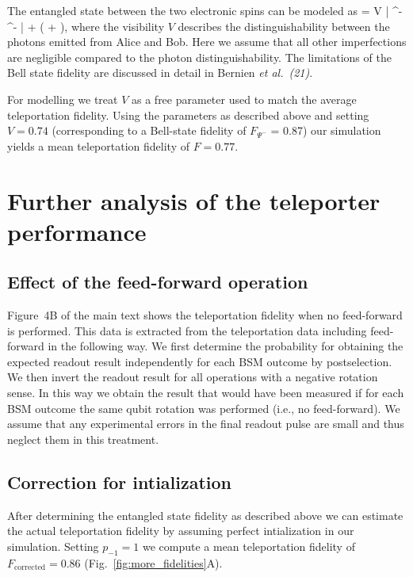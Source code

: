 The entangled state between the two electronic spins can be modeled as
\be
    \rho = V | \Psi^- \rangle \langle \Psi^- | +  \left(  +  \right ),
\ee
where the visibility $V$ describes the distinguishability between the photons emitted from Alice and Bob. Here we assume that all other imperfections are negligible compared to the photon distinguishability. The limitations of the Bell state fidelity are discussed in detail in Bernien {\em et al.}~{\em (21)}. %

For modelling we treat $V$ as a free parameter used to match the average teleportation fidelity. Using the parameters as described above and setting $V = 0.74$ (corresponding to a Bell-state fidelity of $F_{\Psi^-}$ = 0.87) our simulation yields a mean teleportation fidelity of $F = 0.77$.

\section{Further analysis of the teleporter performance}

\subsection{Effect of the feed-forward operation}

Figure~4B of the main text shows the teleportation fidelity when no feed-forward is performed. This data is extracted from the teleportation data including feed-forward in the following way. We first determine the probability for obtaining the expected readout result independently for each BSM outcome by postselection. We then invert the readout result for all operations with a negative rotation sense. In this way we obtain the result that would have been measured if for each BSM outcome the same qubit rotation was performed (i.e., no feed-forward). We assume that any experimental errors in the final readout pulse are small and thus neglect them in this treatment.

\subsection{Correction for intialization}

After determining the entangled state fidelity as described above we can estimate the actual teleportation fidelity by assuming perfect intialization in our simulation. Setting $p_{-1} = 1$ we compute a mean teleportation fidelity of $F_\text{corrected} = 0.86$ (Fig.~\ref{fig:more_fidelities}A).

